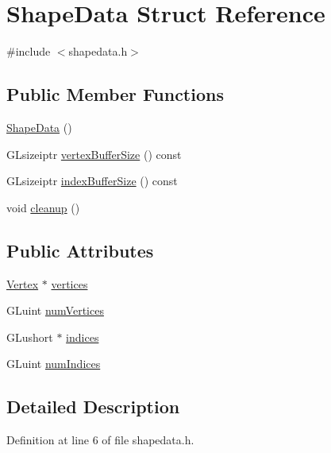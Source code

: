 \hypertarget{struct_shape_data}{}\section{Shape\+Data Struct Reference}
\label{struct_shape_data}


{\ttfamily \#include $<$shapedata.\+h$>$}

\subsection*{Public Member Functions}
\begin{DoxyCompactItemize}
\item 
\hyperlink{struct_shape_data_a76d5ff4056efb0a5703793ef55b06651}{Shape\+Data} ()
\item 
G\+Lsizeiptr \hyperlink{struct_shape_data_a5b838f3fc07c63aeb718b8c22bc3e2cb}{vertex\+Buffer\+Size} () const 
\item 
G\+Lsizeiptr \hyperlink{struct_shape_data_afa0a214679b4acbf5a8e38d10ef48779}{index\+Buffer\+Size} () const 
\item 
void \hyperlink{struct_shape_data_a59e005d5410ad30435357d385e73ef48}{cleanup} ()
\end{DoxyCompactItemize}
\subsection*{Public Attributes}
\begin{DoxyCompactItemize}
\item 
\hyperlink{class_vertex}{Vertex} $\ast$ \hyperlink{struct_shape_data_a4cb9087cff7d75dcba0cc6acf363468b}{vertices}
\item 
G\+Luint \hyperlink{struct_shape_data_a255bf343d438b66c7a5a59f9c2a9be07}{num\+Vertices}
\item 
G\+Lushort $\ast$ \hyperlink{struct_shape_data_ab2814a4ce1455f39db59b819b62fd44e}{indices}
\item 
G\+Luint \hyperlink{struct_shape_data_ab4ef69f08567dec90213e8a204afb6ff}{num\+Indices}
\end{DoxyCompactItemize}


\subsection{Detailed Description}


Definition at line 6 of file shapedata.\+h.



